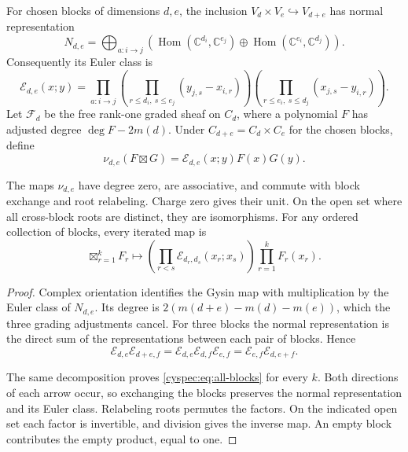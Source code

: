 For chosen blocks of dimensions $d,e$, the inclusion
$V_d\times V_e\hookrightarrow V_{d+e}$ has normal representation
\[
 N_{d,e}=\bigoplus_{a:i\to j}
 \left(\operatorname{Hom}(\mathbb C^{d_i},\mathbb C^{e_j})
 \oplus\operatorname{Hom}(\mathbb C^{e_i},\mathbb C^{d_j})\right).
\]
Consequently its Euler class is
\begin{equation}\label{cyspec:eq:direct-euler}
 \mathcal E_{d,e}(x;y)=
 \prod_{a:i\to j}
 \left(\prod_{r\leq d_i,\ s\leq e_j}(y_{j,s}-x_{i,r})\right)
 \left(\prod_{r\leq e_i,\ s\leq d_j}(x_{j,s}-y_{i,r})\right).
\end{equation}
Let $\mathcal F_d$ be the free rank-one graded sheaf on $C_d$,
where a polynomial $F$ has adjusted degree $\deg F-2m(d)$.
Under $C_{d+e}=C_d\times C_e$ for the chosen blocks, define
\begin{equation}\label{cyspec:eq:direct-map}
 \nu_{d,e}(F\boxtimes G)=\mathcal E_{d,e}(x;y)F(x)G(y).
\end{equation}

\begin{proposition}\label{cyspec:prop:direct-sums}
The maps $\nu_{d,e}$ have degree zero, are associative, and commute
with block exchange and root relabeling. Charge zero gives their unit.
On the open set where all cross-block roots are distinct, they are
isomorphisms. For any ordered collection of blocks, every iterated
map is
\begin{equation}\label{cyspec:eq:all-blocks}
 \boxtimes_{r=1}^k F_r\longmapsto
 \left(\prod_{r<s}\mathcal E_{d_r,d_s}(x_r;x_s)\right)
 \prod_{r=1}^k F_r(x_r).
\end{equation}
\end{proposition}

\begin{proof}
Complex orientation identifies the Gysin map with multiplication
by the Euler class of $N_{d,e}$. Its degree is
$2(m(d+e)-m(d)-m(e))$, which the three grading adjustments cancel.
For three blocks the normal representation is the direct sum of
the representations between each pair of blocks. Hence
\[
 \mathcal E_{d,e}\mathcal E_{d+e,f}
 =\mathcal E_{d,e}\mathcal E_{d,f}\mathcal E_{e,f}
 =\mathcal E_{e,f}\mathcal E_{d,e+f}.
\]

The same decomposition proves \eqref{cyspec:eq:all-blocks} for every
$k$. Both directions of each arrow occur, so exchanging the blocks
preserves the normal representation and its Euler class.
Relabeling roots permutes the factors. On the indicated open set
each factor is invertible, and division gives the inverse map.
An empty block contributes the empty product, equal to one.
\end{proof}

